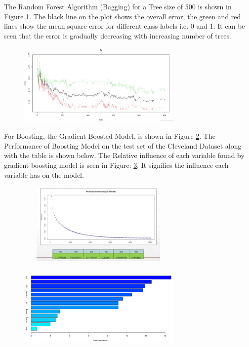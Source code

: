 \documentclass[conference]{IEEEtran}
\begin{document}
The Random Forest Algorithm (Bagging) for a Tree size of 500 is shown in Figure \ref{fig14}. The black line on the plot shows the overall error, the green and red lines show the mean square error for different class labels i.e. 0 and 1. It can be seen that the error is gradually decreasing with increasing number of trees.
\begin{figure}
	\centering
	\includegraphics[height=4cm, width=8cm]{images/Fig14}
	\label{fig14}
\end{figure}


For Boosting, the Gradient Boosted Model, is shown in Figure \ref{fig15}. The Performance of Boosting Model on the test set of the Cleveland Dataset along with the table is shown below. The Relative influence of each variable found by gradient boosting model is seen in Figure: \ref{fig16}. It signifies the influence each variable has on the model.

\begin{figure}
	\centering
	\includegraphics[height=4cm, width=8cm]{images/Fig15}
	\label{fig15}
\end{figure}

\begin{figure}
	\centering
	\includegraphics[height=4cm, width=8cm]{images/Fig16}
	\label{fig16}
\end{figure}
\end{document}
